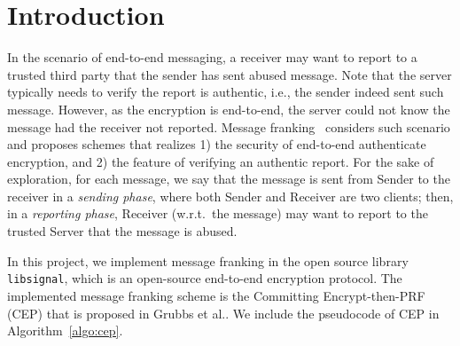 
\section{Introduction}

In the scenario of end-to-end messaging,
a receiver may want to report to a trusted third party 
that the sender has sent abused message.
Note that the server typically needs to verify the report is authentic,
i.e., the sender indeed sent such message.
However, as the encryption is end-to-end,
the server could not know the message had the receiver not reported.
Message franking~\cite{grubbs_message_2017,fb_whitepaper} considers such scenario and proposes schemes
that realizes 1) the security of end-to-end authenticate encryption, and 
2) the feature of verifying an authentic report.
For the sake of exploration,
for each message, 
we say that the message is sent from Sender to the receiver 
in a \emph{sending phase},
where both Sender and Receiver are two clients;
then, in a \emph{reporting phase},
Receiver (w.r.t.~the message) may want to report to the trusted Server
that the message is abused.

In this project, we implement message franking
in the open source library {\tt libsignal},
which is an open-source end-to-end encryption protocol.
The implemented message franking scheme is 
the Committing Encrypt-then-PRF (CEP) that is
proposed in Grubbs et al.\cite{grubbs_message_2017}.
We include the pseudocode of CEP in Algorithm~\ref{algo:cep}.

